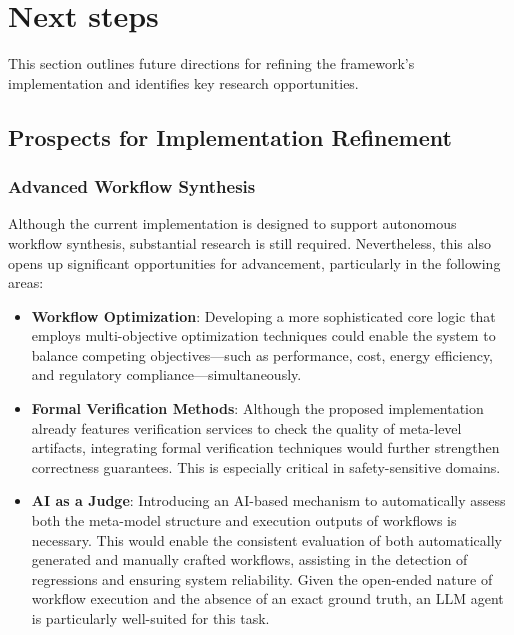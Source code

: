 \section{Next steps} \label{sec:next_steps}

This section outlines future directions for refining the framework’s implementation and identifies key research opportunities.


\subsection{Prospects for Implementation Refinement}


\subsubsection{Advanced Workflow Synthesis }

Although the current implementation is designed to support autonomous workflow synthesis, substantial research is still required. Nevertheless, this also opens up significant opportunities for advancement, particularly in the following areas:


\begin{itemize}[leftmargin=*, label=--]
  
    \item\textbf{Workflow Optimization}: Developing a more sophisticated core logic that employs multi-objective optimization techniques could enable the system to balance competing objectives—such as performance, cost, energy efficiency, and regulatory compliance—simultaneously. 

    \item\textbf{Formal Verification Methods}: Although the proposed implementation already features verification services to check the quality of meta-level artifacts, integrating formal verification techniques would further strengthen correctness guarantees. This is especially critical in safety-sensitive domains.
    
    \item\textbf{AI as a Judge}: Introducing an AI-based mechanism to automatically assess both the meta-model structure and execution outputs of workflows is necessary. This would enable the consistent evaluation of both automatically generated and manually crafted workflows, assisting in the detection of regressions and ensuring system reliability. Given the open-ended nature of workflow execution and the absence of an exact ground truth, an LLM agent is particularly well-suited for this task.

\end{itemize}



